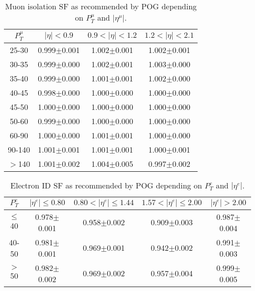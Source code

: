 \begin{table}[h]
  \footnotesize
  \begin{center}
  \caption{Muon isolation SF as recommended by POG depending on $P_T^{\mu}$ and $|\eta^{\mu}|$.} 
   \begin{tabular}{|c|c|c|c|}
 $P_T^{\mu}$  & $|\eta|< 0.9$   & $0.9<|\eta|< 1.2$    & $1.2<|\eta|< 2.1$ \\ \hline
25-30          & 0.999$\pm$0.001   & 1.002$\pm$0.001    & 1.002$\pm$0.001     \\ \hline
30-35          & 0.999$\pm$0.000   & 1.002$\pm$0.001    & 1.003$\pm$0.000        \\ \hline
35-40          & 0.999$\pm$0.000   & 1.001$\pm$0.001    & 1.002$\pm$0.000        \\ \hline
40-45          & 0.998$\pm$0.000   & 1.000$\pm$0.000    & 1.000$\pm$0.000        \\ \hline
45-50          & 1.000$\pm$0.000   & 1.000$\pm$0.000    & 1.000$\pm$0.000        \\ \hline
50-60          & 0.999$\pm$0.000   & 1.000$\pm$0.000    & 1.000$\pm$0.000        \\ \hline
60-90          & 1.000$\pm$0.000   & 1.001$\pm$0.001    & 1.000$\pm$0.000        \\ \hline
90-140         & 1.001$\pm$0.001   & 1.001$\pm$0.001    & 1.000$\pm$0.001        \\ \hline
$>$140         & 1.001$\pm$0.002   & 1.004$\pm$0.005    & 0.997$\pm$0.002        \\ \hline
  \end{tabular}
  \label{tab:SFs_MuonIso}
  \end{center}
\end{table}

\begin{table}[h]
  \footnotesize
  \begin{center}
  \caption{Electron ID SF as recommended by POG depending on $P_T^{e}$ and $|\eta^{e}|$.} 
   \begin{tabular}{|c|c|c|c|c|}
 $P_T^{e}$  & $|\eta^{e}|\leq 0.80$ & $0.80<|\eta^{e}|\leq 1.44$ & $1.57<|\eta^{e}|\leq 2.00$ & $|\eta^{e}|> 2.00$\\ \hline
$\leq$40       & 0.978$\pm$0.001   & 0.958$\pm$0.002        & 0.909$\pm$0.003        & 0.987$\pm$0.004 \\ \hline
40-50          & 0.981$\pm$0.001   & 0.969$\pm$0.001        & 0.942$\pm$0.002        & 0.991$\pm$0.003 \\ \hline
$>$50            & 0.982$\pm$0.002   & 0.969$\pm$0.002        & 0.957$\pm$0.004        & 0.999$\pm$0.005 \\ \hline
  \end{tabular}
  \label{tab:SFs_ElectronID}
  \end{center}
\end{table}

